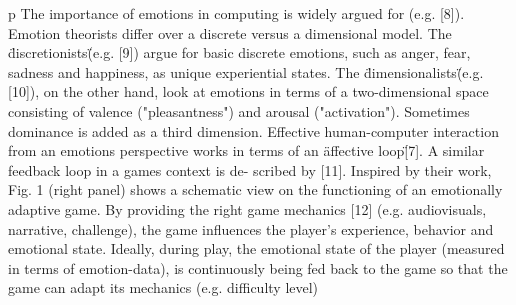p The importance of emotions in computing is widely argued for (e.g. [8]). Emotion theorists differ over a discrete versus a dimensional model. The \"discretionists\" (e.g. [9]) argue for basic discrete emotions, such as anger, fear, sadness and happiness, as unique experiential states. The \"dimensionalists\" (e.g. [10]), on the other hand, look at emotions in terms of a two-dimensional space consisting of valence ("pleasantness") and arousal ("activation"). Sometimes dominance is added as a third dimension.  Effective human-computer interaction from an emotions perspective works in terms of an \"affective loop\" [7]. A similar feedback loop in a games context is de- scribed by [11]. Inspired by their work, Fig. 1 (right panel) shows a schematic view on the functioning of an emotionally adaptive game. By providing the right game mechanics [12] (e.g. audiovisuals, narrative, challenge), the game influences the player's experience, behavior and emotional state. Ideally, during play, the emotional state of the player (measured in terms of emotion-data), is continuously being fed back to the game so that the game can adapt its mechanics (e.g. difficulty level)
